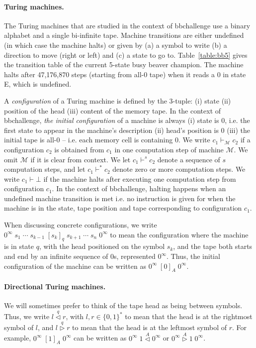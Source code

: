 \documentclass[a4paper,british]{article}
\theoremstyle{definition} %
\numberwithin{equation}{section}
\theoremstyle{definition} %
\newcommand{\lhead}[1]{\stackrel{#1}\triangleleft}
\newcommand{\rhead}[1]{\stackrel{#1}\triangleright}
\begin{document}
\paragraph*{Turing machines.}The Turing machines that are studied in the context of bbchallenge use a binary alphabet and a single bi-infinite tape. Machine transitions are either undefined (in which case the machine halts) or given by (a) a symbol to write (b) a direction to move (right or left) and (c) a state to go to. Table~\ref{table:bb5} gives the transition table of the current 5-state busy beaver champion. The machine halts after 47,176,870 steps (starting from all-0 tape) when it reads a 0 in state E, which is undefined.

A \textit{configuration} of a Turing machine is defined by the 3-tuple: (i) state (ii) position of the head (iii) content of the memory tape. In the context of bbchallenge, \textit{the initial configuration} of a machine is always (i) state is 0, i.e. the first state to appear in the machine's description (ii) head's position is 0 (iii) the initial tape is all-0 -- i.e. each memory cell is containing 0. We write $c_1 \vdash_\mathcal{M} c_2$ if a configuration $c_2$ is obtained from $c_1$ in one computation step of machine $\mathcal{M}$. We omit $\mathcal{M}$ if it is clear from context. We let $c_1 \vdash^s c_2$ denote a sequence of $s$ computation steps, and let  $c_1 \vdash^* c_2$ denote zero or more computation steps. %
We write $c_1 \vdash \bot$ if the machine halts after executing one computation step from configuration $c_1$. In the context of bbchallenge, halting happens when an undefined machine transition  is met i.e. no instruction is given for when the machine is in the state, tape position and tape corresponding to configuration $c_1$.

When discussing concrete configurations, we write
$0^\infty\; s_1\; \cdots\; s_{k-1}\; [s_k]_q\; s_{k+1}\; \cdots\; s_n\; 0^\infty$
to mean the configuration where the machine is in state $q$, with the head
positioned on the symbol $s_k$, and the tape both starts and end by an infinite sequence of 0s, represented $0^\infty$. Thus, the initial configuration of the machine
can be written as $0^\infty\; [0]_A\; 0^\infty$.

\paragraph*{Directional Turing machines.} We will sometimes prefer to think of the tape head as being between
symbols. Thus, we write $l \lhead{q} r$, with $l,r\in\{0,1\}^*$ to mean that the head is at the rightmost symbol
of $l$, and $l \rhead{q} r$ to mean that the head is at the leftmost symbol of $r$.
For example, $0^\infty\; [1]_A\; 0^\infty$ can be written as
$0^\infty\; 1 \lhead A 0^\infty$ or $0^\infty \rhead A 1\; 0^\infty$.
\end{document}
